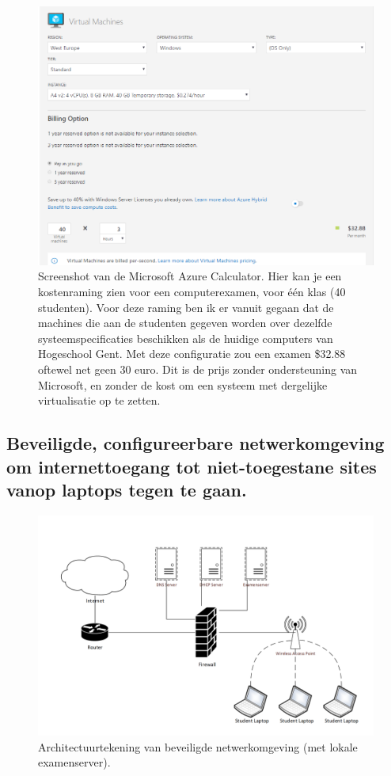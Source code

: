	
	\begin{figure}
	\includegraphics[width=\linewidth]{img/AzCalc.PNG}
	\caption{Screenshot van de Microsoft Azure Calculator. Hier kan je een kostenraming zien voor een computerexamen, voor één klas (40 studenten). Voor deze raming ben ik er vanuit gegaan dat de machines die aan de studenten gegeven worden over dezelfde systeemspecificaties beschikken als de huidige computers van Hogeschool Gent. Met deze configuratie zou een examen \$32.88 oftewel net geen 30 euro. Dit is de prijs zonder ondersteuning van Microsoft, en zonder de kost om een systeem met dergelijke virtualisatie op te zetten.}
	\label{fig:Calculator1}
\end{figure}

	
	
\newpage

\subsection{Beveiligde, configureerbare netwerkomgeving om internettoegang tot niet-toegestane sites vanop laptops tegen te gaan.	}

	\begin{figure}
	\includegraphics[width=\linewidth]{img/OpstellingNWOMG}
	\caption{Architectuurtekening van beveiligde netwerkomgeving (met lokale examenserver).}
	\label{fig:Omgeving1}
\end{figure}


